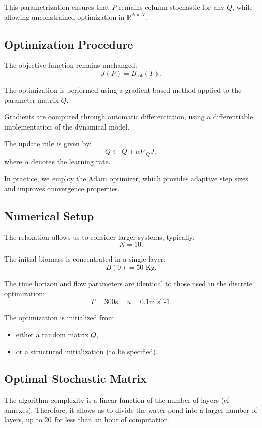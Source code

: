 \documentclass{article}
\begin{document}
This parametrization ensures that $P$ remains column-stochastic for any $Q$, 
while allowing unconstrained optimization in $\mathbb{R}^{N \times N}$.
\subsection{Optimization Procedure}

The objective function remains unchanged:
\[
J(P) = B_{\text{tot}}(T).
\]

The optimization is performed using a gradient-based method applied to the parameter matrix $Q$.

Gradients are computed through automatic differentiation, using a differentiable implementation 
of the dynamical model.

The update rule is given by:
\[
Q \leftarrow Q + \alpha \nabla_Q J,
\]
where $\alpha$ denotes the learning rate.

In practice, we employ the Adam optimizer, which provides adaptive step sizes and improves 
convergence properties.

\subsection{Numerical Setup}

The relaxation allows us to consider larger systems, typically:
\[
N = \text{10}.
\]

The initial biomass is concentrated in a single layer:
\[
B(0) = \text{50 Kg}.
\]

The time horizon and flow parameters are identical to those used in the discrete optimization:
\[
T = 300 \text{s,} \quad u = 0.1\text{m.s^{-1}}.
\]

The optimization is initialized from:
\begin{itemize}
    \item either a random matrix $Q$,
    \item or a structured initialization (to be specified).
\end{itemize}

\subsection{Optimal Stochastic Matrix}


The algorithm complexity is a linear function of the number of layers (cf annexes).
Therefore, it allows us to divide the water pond into a larger number of layers, up to 20 for less than an hour of computation.
\end{document}
